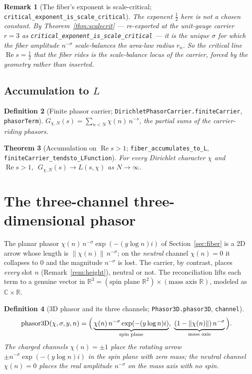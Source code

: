\documentclass[11pt]{article}
\newtheorem{definition}{Definition}[section]
\newtheorem{theorem}[definition]{Theorem}
\newtheorem{remark}[definition]{Remark}
\DeclareMathOperator{\Ree}{Re}
\newcommand{\C}{\mathbb{C}}
\newcommand{\R}{\mathbb{R}}
\newcommand{\code}[1]{\texttt{#1}}
\begin{document}
\begin{remark}[The fiber's exponent is scale-critical; \code{critical\_exponent\_is\_scale\_critical}]\label{rem:ridescrit}
The exponent $\tfrac12$ here is not a chosen constant. By Theorem~\ref{thm:scalecrit} --- re-exported at
the unit-gauge carrier $r=3$ as \code{critical\_exponent\_is\_scale\_critical} --- it is the unique
$\sigma$ for which the fiber amplitude $n^{-\sigma}$ scale-balances the area-law radius $r_n$. So the
critical line $\Ree s=\tfrac12$ that the fiber rides is the scale-balance locus of the carrier, forced
by the geometry rather than inserted.
\end{remark}

\subsection{Accumulation to $L$}

\begin{definition}[Finite phasor carrier; \code{DirichletPhasorCarrier.finiteCarrier}, \code{phasorTerm}]\label{def:finite}
$G_{\chi,N}(s)=\sum_{n<N}\chi(n)\,n^{-s}$, the partial sums of the carrier-riding phasors.
\end{definition}

\begin{theorem}[Accumulation on $\Ree s>1$; \code{fiber\_accumulates\_to\_L}, \code{finiteCarrier\_tendsto\_LFunction}]\label{thm:accum}
For every Dirichlet character $\chi$ and $\Ree s>1$, $\;G_{\chi,N}(s)\to L(s,\chi)$ as $N\to\infty$.
\end{theorem}

\section{The three-channel three-dimensional phasor}\label{sec:phasor3d}

The planar phasor $\chi(n)\,n^{-\sigma}\exp(-(y\log n)i)$ of Section~\ref{sec:fiber} is a 2D arrow
whose length is $\|\chi(n)\|\,n^{-\sigma}$; on the \emph{neutral} channel $\chi(n)=0$ it collapses to
$0$ and the magnitude $n^{-\sigma}$ is lost. The carrier, by contrast, places \emph{every} slot $n$
(Remark~\ref{rem:height}), neutral or not. The reconciliation lifts each term to a genuine vector in
$\R^3=(\text{spin plane }\R^2)\times(\text{mass axis }\R)$, modeled as $\C\times\R$.

\begin{definition}[3D phasor and its three channels; \code{Phasor3D.phasor3D}, \code{channel}]\label{def:phasor3d}
\[
  \mathrm{phasor3D}(\chi,\sigma,y,n)=\Bigl(\,\underbrace{\chi(n)\,n^{-\sigma}\exp(-(y\log n)i)}_{\text{spin plane}},\
  \underbrace{(1-\|\chi(n)\|)\,n^{-\sigma}}_{\text{mass axis}}\,\Bigr).
\]
The charged channels $\chi(n)=\pm1$ place the rotating arrow $\pm n^{-\sigma}\exp(-(y\log n)i)$ in the
spin plane with zero mass; the neutral channel $\chi(n)=0$ places the real amplitude $n^{-\sigma}$ on
the mass axis with no spin.
\end{definition}
\end{document}
